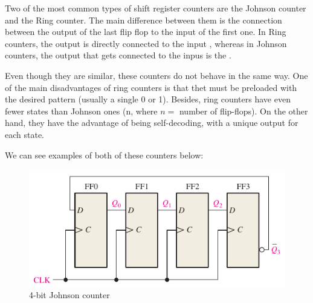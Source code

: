 Two of the most common types of shift register counters are the Johnson counter and the Ring counter. The main difference between them is the connection between the output of the last flip flop to the input of the first one. In Ring counters, the output  is directly connected to the input , whereas in Johnson counters, the output that gets connected to the inpus is the . \medskip

Even though they are similar, these counters do not behave in the same way. One of the main disadvantages of ring counters is that thet must be preloaded with the desired pattern (usually a single 0 or 1). Besides, ring counters have even fewer states than Johnson ones (n, where $n = $ number of flip-flops). On the other hand, they have the advantage of being self-decoding, with a unique output for each state.\medskip

We can see examples of both of these counters below:

\begin{figure}[H]
    \centering
    \includegraphics[scale = 0.8]{Graphics/Practice 5/COUNTERS/Johnson_Counter_467.pdf}
    \caption{4-bit Johnson counter ~\autocite{FLOYD}}
    \label{fig:JOHNSON_4_BIT}
\end{figure}

